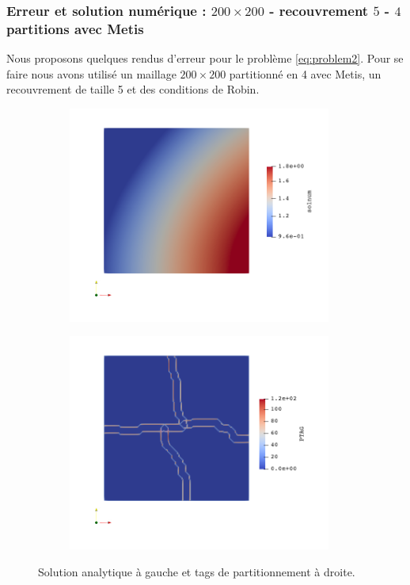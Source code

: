 \documentclass[a4paper,11pt]{article}
\begin{document}
\subsubsection{Erreur et solution numérique : $200\times 200$ - recouvrement $5$ - $4$ partitions avec Metis}
\noindent Nous proposons quelques rendus d'erreur pour le problème \eqref{eq:problem2}. Pour se faire nous avons utilisé un maillage $200\times 200$ partitionné en 4 avec Metis, un recouvrement de taille 5 et des conditions de Robin.
\vspace{-8mm}
\begin{figure}[H]
	\begin{subfigure}[t]{0.45\textwidth}
		\centering
		\includegraphics[width=0.95\textwidth]{metis_200_200_solnum.png}
	\end{subfigure}
	\hfill
	\begin{subfigure}[t]{0.45\textwidth}
		\centering
		\includegraphics[width=0.95\textwidth]{metis_200_200_ptag.png}
	\end{subfigure}
	\caption{Solution analytique à gauche et tags de partitionnement à droite.}
\end{figure}
\end{document}
